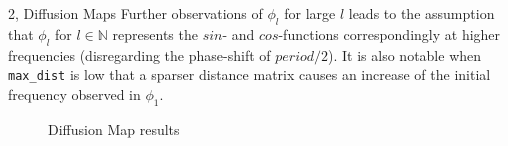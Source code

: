 \begin{task}{2, Diffusion Maps}
Further observations of $\phi_l$ for large $l$ leads to the assumption that $\phi_l$ for $l\in\mathbb{N}$ represents the $sin$- and $cos$-functions correspondingly at higher frequencies (disregarding the phase-shift of $period/2$). It is also notable when \verb|max_dist| is low that a sparser distance matrix causes an increase of the initial frequency observed in $\phi_1$.

\begin{figure}[H]
\centering
{}
\caption{Diffusion Map results}
\label{fig:t2_1-dmapAll}
\end{figure}


\end{task}
